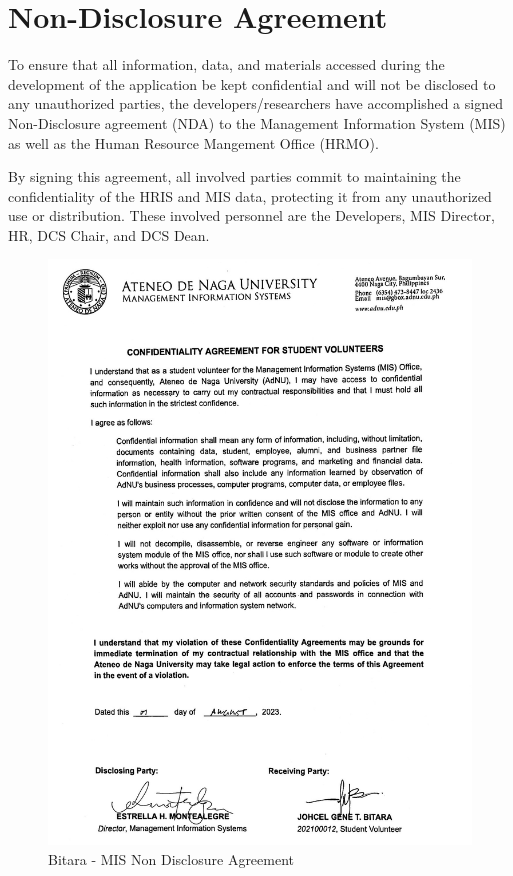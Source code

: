 \chapter{Non-Disclosure Agreement}

\label{nda}

To ensure that all information, data, and materials accessed during the development of the application be kept confidential and will not be disclosed to any unauthorized parties, the developers/researchers have accomplished a signed Non-Disclosure agreement (NDA) to the Management Information System (MIS) as well as the Human Resource Mangement Office (HRMO). 

By signing this agreement, all involved parties commit to maintaining the confidentiality of the HRIS and MIS data, protecting it from any unauthorized use or distribution. These involved personnel are the Developers, MIS Director, HR, DCS Chair, and DCS Dean.

\begin{figure}[H]
    \centering
    \includegraphics[width=1\textwidth]{figures/images/mis-nda-bitara.JPG}
    \caption{Bitara - MIS Non Disclosure Agreement}
    \label{fig:mis-nda-bitara}
\end{figure}

